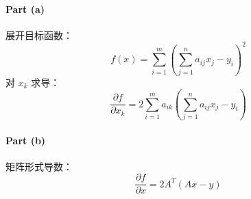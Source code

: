 \paragraph{Part (a)}  
展开目标函数：
\[
f(x) = \sum_{i=1}^m \left( \sum_{j=1}^n a_{ij}x_j - y_i \right)^2
\]
对 \(x_k\) 求导：
\[
\frac{\partial f}{\partial x_k} = 2\sum_{i=1}^m a_{ik} \left( \sum_{j=1}^n a_{ij}x_j - y_i \right)
\]

\paragraph{Part (b)}  
矩阵形式导数：
\[
\frac{\partial f}{\partial x} = 2A^T(Ax - y)
\]